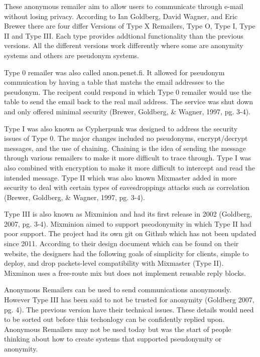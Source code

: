 \documentclass[12pt]{article}
\begin{document}
These anonymous remailer aim to allow users to communicate through e-mail without losing privacy. According to Ian Goldberg, David Wagner, and Eric Brewer there are four differ Versions of Type X Remailers, Type O, Type I, Type II and Type III. Each type provides addtional functionality than the previous versions. All the different versions work differently where some are anonymity systems and others are pseudonym systems.

Type 0 remailer was also called anon.penet.fi. It allowed for pseudonym commuication by having a table that matchs the email addresses to the pseudonym. The recipent could respond in which Type 0 remailer would use the table to send the email back to the real mail address. The service was shut down and only offered minimal security (Brewer, Goldberg, \& Wagner, 1997, pg. 3-4).

Type I was also known as Cypherpunk was designed to address the security issues of Type 0. The major changes included no pseudonyms, encrypt/decrypt messages, and the use of chaining. Chaining is the idea of sending the message through various remailers to make it more difficult to trace through. Type I was also combined with encryption to make it more difficult to intercept and read the intended message. Type II which was also known  Mixmaster added in more security to deal with certain types of eavesdroppings attacks such as correlation (Brewer, Goldberg, \& Wagner, 1997, pg. 3-4).

Type III is also known as Mixminion and had its first release in 2002 (Goldberg, 2007, pg. 3-4). Mixminion aimed to support pseodonymity in which Type II had poor support. The project had its own git on Github which has not been updated since 2011. According to their design document which can be found on their website, the designers had the following goals of simplicity for clients, simple to deploy, and drop packets-level compatibility with Mixmaster (Type II).  Mixminon uses a free-route mix but does not implement reusable reply blocks.

Anonymous Remailers can be used to send communications anonymously. However Type III  has been said to not be trusted for anonymity (Goldberg 2007, pg. 4). The previous version have their technical issues. These details would need to be sorted out before this techonlogy can be confidently replied upon. Anonymous Remailers may not be used today but was the start of people thinking about how to create systems that supported pseudonymity or anonymity.
\end{document}
